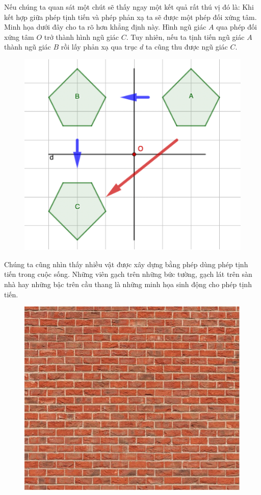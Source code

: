 \begin{multicols}{2}
	Nếu chúng ta quan sát một chút sẽ thấy ngay một kết quả rất thú vị đó là: Khi kết hợp giữa phép tịnh tiến và phép phản xạ ta sẽ được một phép đối xứng tâm. Minh họa dưới đây cho ta rõ hơn khẳng định này.
	Hình ngũ giác $A$ qua phép đối xứng tâm $O$ trở thành hình ngũ giác $C$. Tuy nhiên, nếu ta tịnh tiến ngũ giác $A$ thành ngũ giác $B$ rồi lấy phản xạ qua trục $d$ ta cũng thu được ngũ giác $C$.
	\begin{figure}[H]
		\vspace*{-5pt}
		\centering
		\captionsetup{labelformat= empty, justification=centering}
		\includegraphics[width= 1\linewidth]{Picture33}
		\vspace*{-10pt}
	\end{figure}
	Chúng ta cũng nhìn thấy nhiều vật được xây dựng bằng phép dùng phép tịnh tiến trong cuộc sống. Những viên gạch trên những bức tường, gạch lát trên sàn nhà hay những bậc trên cầu thang là những minh họa sinh động cho phép tịnh tiến.
	\begin{figure}[H]
		\vspace*{-5pt}
		\centering
		\captionsetup{labelformat= empty, justification=centering}
		\includegraphics[width= 1\linewidth]{Picture34}

\end{figure}
\end{multicols}
